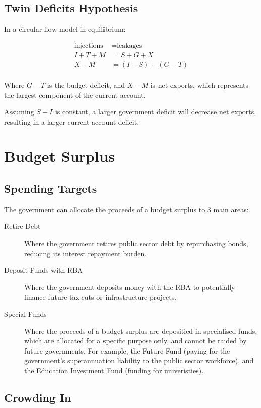 \documentclass[a4paper,11pt]{article}
\begin{document}
\subsection{Twin Deficits Hypothesis}

In a circular flow model in equilibrium:

$$
\begin{aligned}
\text{injections} & = \text{leakages} \\
I + T + M & = S + G + X \\
X - M & = (I - S) + (G - T) \\
\end{aligned}
$$

Where $G - T$ is the budget deficit, and $X - M$ is net exports, which
represents the largest component of the current account.

Assuming $S - I$ is constant, a larger government deficit will decrease net
exports, resulting in a larger current account deficit.



\section{Budget Surplus}

\subsection{Spending Targets}

The government can allocate the proceeds of a budget surplus to 3 main areas:

\begin{description}
\item [Retire Debt] Where the government retires public sector debt by
	repurchasing bonds, reducing its interest repayment burden.
\item [Deposit Funds with RBA] Where the government deposits money with the RBA
	to potentially finance future tax cuts or infrastructure projects.
\item [Special Funds] Where the proceeds of a budget surplus are depositied in
	specialised funds, which are allocated for a specific purpose only, and
	cannot be raided by future governments. For example, the Future Fund (paying
	for the government's superannuation liability to the public sector
	workforce), and the Education Investment Fund (funding for univeristies).
\end{description}


\subsection{Crowding In}
\end{document}

